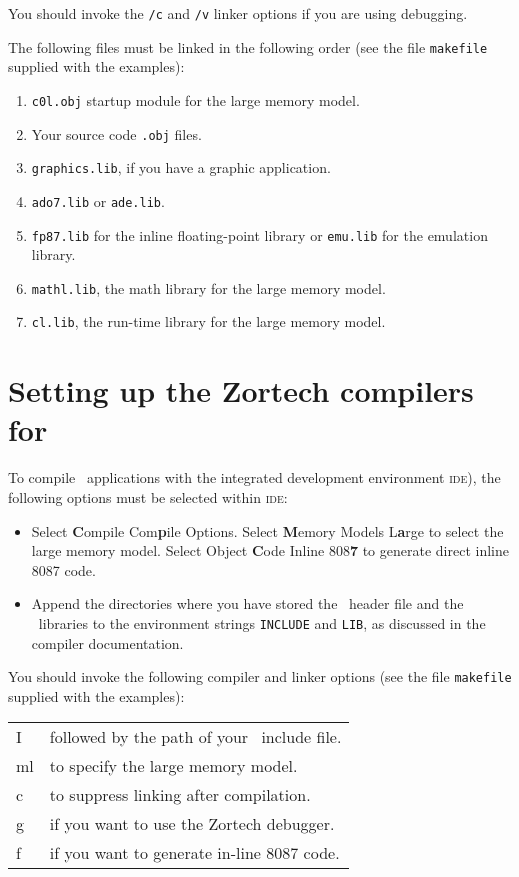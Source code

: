 \documentclass{admbmanual}
\makeatletter
\newenvironment{commandtable}
  { 
    \par
    \begin{tabular}{@{\vrule height 12pt depth7pt width0pt}@{\tt-}l @{\rm\quad} l}
  }
  {
    \end{tabular}
    \medskip
   }
\makeatother
\begin{document}
You should invoke the \texttt{/c} and \texttt{/v} linker options 
if you are using debugging.

The following files must be linked in the following order
(see the file \texttt{makefile} supplied with the examples): 
\begin{enumerate}
  \item \texttt{c0l.obj} startup module for the large memory model.
  \item Your source code \texttt{.obj} files.
  \item \texttt{graphics.lib}, if you have a graphic application.
  \item \texttt{ado7.lib} or \texttt{ade.lib}.
  \item \texttt{fp87.lib} for the inline floating-point library or \texttt{emu.lib} for the emulation library.
  \item \texttt{mathl.lib}, the math library for the large memory model. 
  \item \texttt{cl.lib}, the run-time library for the large memory model.
\end{enumerate}


\section{Setting up the Zortech compilers for \scAD}

To compile \scAD\ applications with the integrated development environment
\textsc{ide}), the following options must be selected within \textsc{ide}:
\begin{itemize}
  \item  Select {\bf C}ompile Com{\bf p}ile Options. 
  Select {\bf M}emory Models L{\bf a}rge to select the large memory model.
  Select Object {\bf C}ode Inline 808{\bf 7} to generate direct inline 8087 code.

  \item  Append the directories where you have stored the \scAD\ header
  file and the \scAD\ libraries to the environment strings \texttt{INCLUDE} and
  \texttt{LIB}, as discussed in the compiler documentation.
\end{itemize}

You should invoke the following
compiler and linker options (see the file \texttt{makefile} supplied with the examples):

\begin{commandtable}  
 I  &  followed by the path of your \scAD\ include file.\\
 ml  &  to specify the large memory model.\\
 c  &  to suppress linking after compilation.\\
 g  &  if you want to use the Zortech debugger.\\
 f  &  if you want to generate in-line 8087 code.\\
\end{commandtable}
\end{document}
